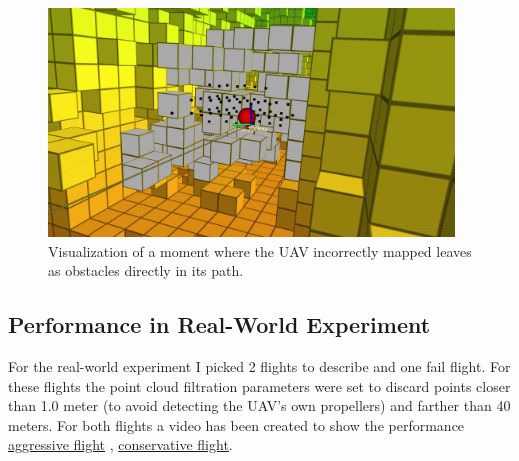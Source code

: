             \begin{figure}[htbp]
                \centering
                \includegraphics[width=0.96\textwidth]{./fig/rviz/deadlock_moment_mapping_gray.png}
                \caption{
                    Visualization of a moment where the \ac{UAV} incorrectly mapped leaves as obstacles directly in its path. 
                }
                \label{fig:map_fail}
            \end{figure}

        
        \subsection{Performance in Real-World Experiment}
            For the real-world experiment I picked 2 flights to describe and one fail flight. 
            For these flights the point cloud filtration parameters were set to discard points closer than 1.0 meter (to avoid detecting the \ac{UAV}'s own propellers) and farther than 40 meters.
            For both flights a video has been created to show the performance \href{https://www.youtube.com/watch?v=DFt222gnA_w&ab_channel=MichalKamler}{aggressive flight} \cite{aggressive_flight}, \href{https://www.youtube.com/watch?v=AJPk0yVCPUo&ab_channel=MichalKamler}{conservative flight}\cite{conservative_flight}.
            
